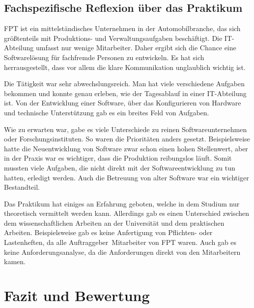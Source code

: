 \documentclass{Vorlage}
\begin{document}
\subsection{Fachspezifische Reflexion über das Praktikum}

FPT ist ein mittelständisches Unternehmen in der Automobilbranche, das sich größtenteils mit Produktions- und
Verwaltungsaufgaben beschäftigt. Die IT-Abteilung umfasst nur wenige Mitarbeiter. Daher ergibt sich die Chance
eine Softwarelösung für fachfremde Personen zu entwickeln. Es hat sich herrausgestellt, dass vor allem die 
klare Kommunikation unglaublich wichtig ist.

Die Tätigkeit war sehr abwechslungsreich. Man hat viele verschiedene Aufgaben bekommen und konnte genau
erleben, wie der Tagesablauf in einer IT-Abteilung ist. Von der Entwicklung einer Software, über das
Konfigurieren von Hardware und technische Unterstützung gab es ein breites Feld von Aufgaben.

Wie zu erwarten war, gabe es viele Unterschiede zu reinen Softwareunternehmen oder Forschungsinstituten.
So waren die Prioritäten anders gesetzt. Beispielsweise hatte die Neuentwicklung von Software zwar schon 
einen hohen Stellenwert, aber in der Praxis war es wichtiger, dass die Produktion reibungslos läuft. Somit
mussten viele Aufgaben, die nicht direkt mit der Softwareentwicklung zu tun hatten, erledigt werden. Auch 
die Betreuung von alter Software war ein wichtiger Bestandteil.

Das Praktikum hat einiges an Erfahrung geboten, welche in dem Studium nur theoretisch vermittelt werden kann.
Allerdings gab es einen Unterschied zwischen dem wissenschaftlichen Arbeiten an der Universität und dem 
praktischen Arbeiten. Beispielsweise gab es keine Anfertigung von Pflichten- oder Lastenheften, da alle
\glqq Auftraggeber\grqq \, Mitarbeiter von FPT waren. Auch gab es keine Anforderungsanalyse, da die
Anforderungen direkt von den Mitarbeitern kamen.

\newpage

\renewcommand{\thesection}{\Roman{section}}

\section{Fazit und Bewertung}
\end{document}

